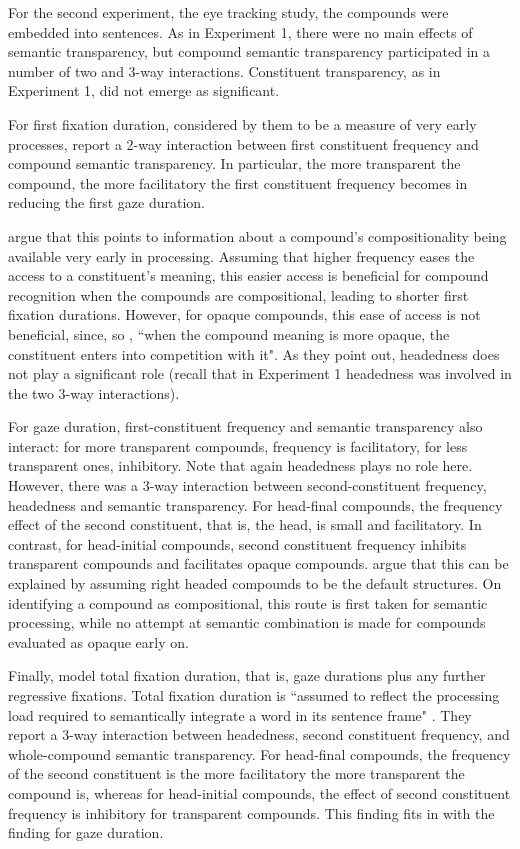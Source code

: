 For the second
experiment, the eye tracking study, the compounds were embedded into
sentences. As in Experiment 1, there were no main effects of
semantic transparency, but compound semantic transparency participated
in a number of two and 3-way interactions. Constituent
transparency, as in Experiment 1, did not emerge as significant.

For first fixation duration, considered by them to be a
measure of very early processes, \citet{MarelliandLuzzatti:2012}
report a 2-way interaction
between first constituent frequency and compound semantic
transparency. In particular, the more transparent the compound, the
more facilitatory the first constituent frequency becomes in reducing
the first gaze duration.  

\citet{MarelliandLuzzatti:2012} argue that this points to
information about a compound's compositionality being available very
early in processing. Assuming that higher frequency eases the access
to a constituent's meaning, this easier access is beneficial for compound recognition when the compounds are compositional, leading to
shorter first fixation durations. However, for
opaque compounds, this ease of access is not beneficial, since, so
\citet[658]{MarelliandLuzzatti:2012}, ``when the compound meaning is more
opaque, the constituent enters into competition with it". As they point
out, headedness does not play a significant role (recall that in
Experiment 1 headedness was involved in the two 3-way interactions).

For gaze duration, first-constituent frequency and semantic
transparency also interact: for more transparent compounds, frequency is
facilitatory, for less transparent ones, inhibitory. Note that again
headedness plays no role here. However, there was a 3-way
interaction between second-constituent frequency, headedness and
semantic transparency. For head-final compounds, the frequency effect
of the second constituent, that is, the head, is small and
facilitatory. In contrast, for head-initial compounds, second
constituent frequency inhibits transparent compounds and facilitates
opaque compounds. \citet{MarelliandLuzzatti:2012} argue that this can
be explained by assuming right headed compounds to be the default
structures. On identifying a compound as compositional, this route is
first taken for semantic processing, while no attempt at semantic
combination is made for compounds evaluated as opaque early on. 

Finally, \citet[661]{MarelliandLuzzatti:2012} model total fixation
duration, that is, gaze durations plus any further regressive
fixations. Total fixation duration is
``assumed to reflect the processing load required to semantically
integrate a word in its sentence frame" \citep[661]{MarelliandLuzzatti:2012}. They report a 3-way interaction between headedness,
second constituent frequency, and whole-compound semantic
transparency. For head-final compounds, the frequency of the second
constituent is the more facilitatory the more transparent the compound
is, whereas for head-initial compounds, the effect of second
constituent frequency is inhibitory for transparent compounds. This
finding fits in with the finding for gaze duration.

